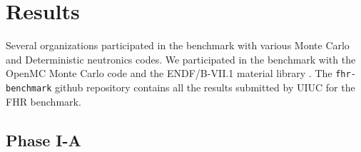 \section{Results}
Several organizations participated in the benchmark with various Monte Carlo
and Deterministic neutronics codes. 
We participated in the benchmark with the OpenMC Monte Carlo code 
\cite{romano_openmc_2013} and the ENDF/B-VII.1 material library 
\cite{chadwick_endf/b-vii.1_2011}.
The \texttt{fhr-benchmark} github repository contains all the results submitted 
by \gls{UIUC} for the \gls{FHR} benchmark. 
\subsection{Phase I-A}